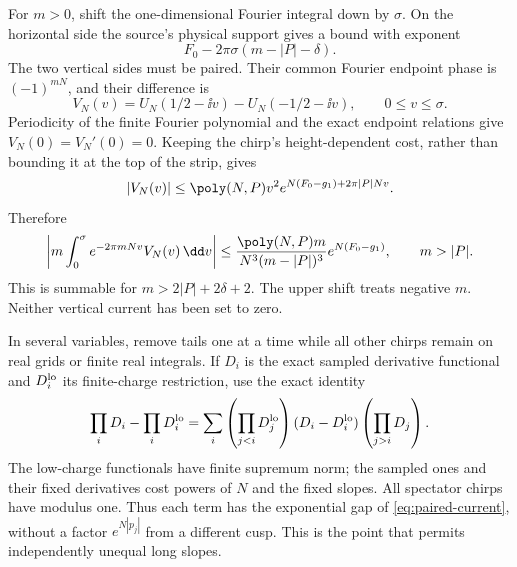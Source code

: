 For $m>0$, shift the one-dimensional Fourier integral down by $\sigma$. On the horizontal side the source's physical support gives a bound with exponent
\[
 F_0-2\pi\sigma(m-|P|-\delta).
\]
The two vertical sides must be paired. Their common Fourier endpoint phase is $(-1)^{mN}$, and their difference is
\[
 V_N(v)=U_N(1/2-\ii v)-U_N(-1/2-\ii v),\qquad0\le v\le\sigma.
\]
Periodicity of the finite Fourier polynomial and the exact endpoint relations give $V_N(0)=V_N'(0)=0$. Keeping the chirp's height-dependent cost, rather than bounding it at the top of the strip, gives
\[
 |V_N(v)|\le\poly(N,P)v^2e^{N(F_0-g_1)+2\pi|P|Nv}.
\]
Therefore
\begin{equation}\label{eq:paired-current}
 \left|m\int_0^\sigma e^{-2\pi mNv}V_N(v)\,\dd v\right|
 \le\frac{\poly(N,P)m}{N^3(m-|P|)^3}e^{N(F_0-g_1)},
 \qquad m>|P|.
\end{equation}
This is summable for $m>2|P|+2\delta+2$. The upper shift treats negative $m$. Neither vertical current has been set to zero.

In several variables, remove tails one at a time while all other chirps remain on real grids or finite real integrals. If $D_i$ is the exact sampled derivative functional and $D_i^{\rm lo}$ its finite-charge restriction, use the exact identity
\[
 \prod_iD_i-\prod_iD_i^{\rm lo}
 =\sum_i\left(\prod_{j<i}D_j^{\rm lo}\right)
 (D_i-D_i^{\rm lo})\left(\prod_{j>i}D_j\right).
\]
The low-charge functionals have finite supremum norm; the sampled ones and their fixed derivatives cost powers of $N$ and the fixed slopes. All spectator chirps have modulus one. Thus each term has the exponential gap of \eqref{eq:paired-current}, without a factor $e^{N|p_j|}$ from a different cusp. This is the point that permits independently unequal long slopes.

